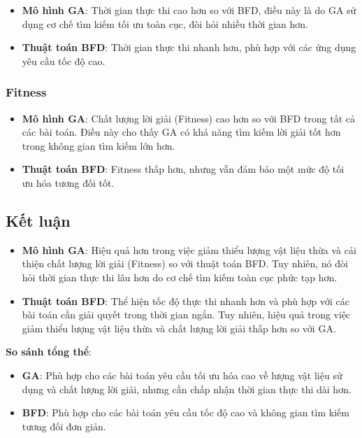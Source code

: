 \documentclass[a4paper]{article}
\begin{document}
\begin{itemize}
    \item \textbf{Mô hình GA}: Thời gian thực thi cao hơn so với BFD, điều này là do GA sử dụng cơ chế tìm kiếm tối ưu toàn cục, đòi hỏi nhiều thời gian hơn.
    \item \textbf{Thuật toán BFD}: Thời gian thực thi nhanh hơn, phù hợp với các ứng dụng yêu cầu tốc độ cao.
\end{itemize}

\subsubsection{Fitness}

\begin{itemize}
    \item \textbf{Mô hình GA}: Chất lượng lời giải (Fitness) cao hơn so với BFD trong tất cả các bài toán. Điều này cho thấy GA có khả năng tìm kiếm lời giải tốt hơn trong không gian tìm kiếm lớn hơn.
    \item \textbf{Thuật toán BFD}: Fitness thấp hơn, nhưng vẫn đảm bảo một mức độ tối ưu hóa tương đối tốt.
\end{itemize}

\subsection{Kết luận}

\begin{itemize}
    \item \textbf{Mô hình GA}: Hiệu quả hơn trong việc giảm thiểu lượng vật liệu thừa và cải thiện chất lượng lời giải (Fitness) so với thuật toán BFD. Tuy nhiên, nó đòi hỏi thời gian thực thi lâu hơn do cơ chế tìm kiếm toàn cục phức tạp hơn.
    \item \textbf{Thuật toán BFD}: Thể hiện tốc độ thực thi nhanh hơn và phù hợp với các bài toán cần giải quyết trong thời gian ngắn. Tuy nhiên, hiệu quả trong việc giảm thiểu lượng vật liệu thừa và chất lượng lời giải thấp hơn so với GA.
\end{itemize}

\textbf{So sánh tổng thể}:
\begin{itemize}
    \item \textbf{GA}: Phù hợp cho các bài toán yêu cầu tối ưu hóa cao về lượng vật liệu sử dụng và chất lượng lời giải, nhưng cần chấp nhận thời gian thực thi dài hơn.
    \item \textbf{BFD}: Phù hợp cho các bài toán yêu cầu tốc độ cao và không gian tìm kiếm tương đối đơn giản.
\end{itemize}
\end{document}
